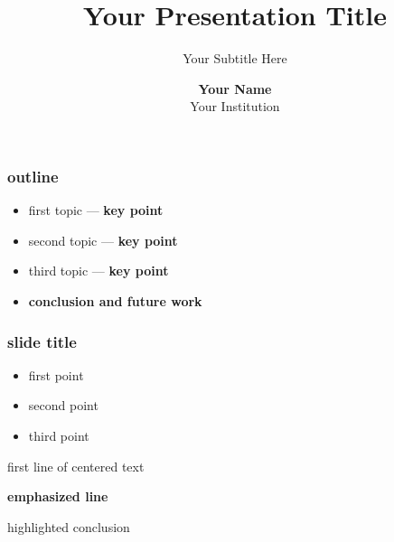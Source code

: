 \documentclass[aspectratio=169, 14pt]{beamer}
\title[]{\hspace*{-0.3cm}\Large Your Presentation Title}
\subtitle[]{\hspace*{-0.3cm}\large Your Subtitle Here}
\author[]{\hspace*{-0.3cm}\normalsize \textbf{Your Name} \\
          \hspace*{-0.3cm}\normalsize Your Institution}
\date{}
\begin{document}
{
\frame[plain]{
    \vspace{-0.8cm}
    \titlepage
}
}

\begin{frame}

    \frametitle{outline}

    \vspace{-1em}

    \begin{itemize}
        \setlength{\itemindent}{-1em}
        \setlength\itemsep{1.75em}
        \item first topic --- \textbf{key point}
        \item second topic --- \textbf{key point}
        \item third topic --- \textbf{key point}
        \item \textbf{conclusion and future work}
    \end{itemize}

\end{frame}


\begin{frame}

    \frametitle{slide title}

    \vspace{-1em}

    \begin{itemize}
        \setlength{\itemindent}{-1em}
        \setlength\itemsep{1.5em}
        \item first point
        \item second point
        \item third point
    \end{itemize}

\end{frame}


{
\begin{frame}

    \centerline{\large first line of centered text}

    \bigskip
    \bigskip
    \bigskip

    \centerline{\large \textbf{emphasized line}}

    \bigskip
    \bigskip
    \bigskip

    \centerline{\large \color{DarkGreen} highlighted conclusion}

\end{frame}
}
\end{document}
